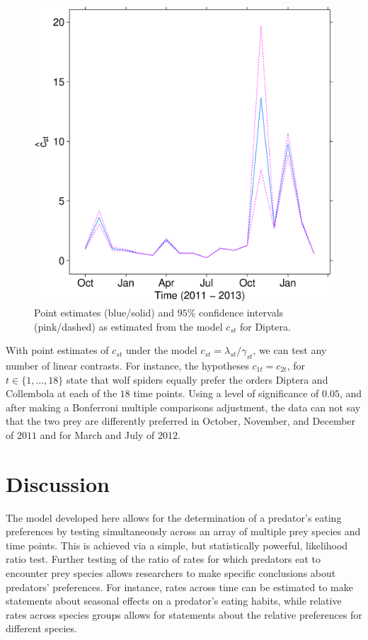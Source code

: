 \documentclass[12pt]{article}
\begin{document}
\begin{figure}
  \centering
  \includegraphics[scale=0.35]{est_dipt}
  \caption{Point estimates (blue/solid) and $95\%$ confidence intervals (pink/dashed) as estimated from the model $c_{st}$ for Diptera.}
  \label{fig:est_dipt}
\end{figure}

With point estimates of $c_{st}$ under the model $c_{st} = \lambda_{st}/\gamma_{st}$, we can test any number of linear contrasts.  For instance, the hypotheses $c_{1t} = c_{2t}$, for $t \in \{1, \ldots, 18\}$ state that wolf spiders equally prefer the orders Diptera and Collembola at each of the $18$ time points.  Using a level of significance of $0.05$, and after making a Bonferroni multiple comparisons adjustment, the data can not say that the two prey are differently preferred in October, November, and December of $2011$ and for March and July of $2012$.  

\section{Discussion}
\label{sec:discussion}

The model developed here allows for the determination of a predator's eating preferences by testing simultaneously across an array of multiple prey species and time points.  This is achieved via a simple, but statistically powerful, likelihood ratio test.  Further testing of the ratio of rates for which predators eat to encounter prey species allows researchers to make specific conclusions about predators' preferences.  For instance, rates across time can be estimated to make statements about seasonal effects on a predator's eating habits, while relative rates across species groups allows for statements about the relative preferences for different species.
\end{document}
